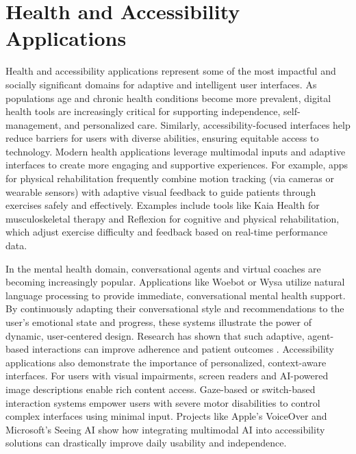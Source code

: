 \documentclass[openany]{book}
\begin{document}
\section{Health and Accessibility Applications}
Health and accessibility applications represent some of the most impactful and socially significant domains for adaptive and intelligent user interfaces. As populations age and chronic health conditions become more prevalent, digital health tools are increasingly critical for supporting independence, self-management, and personalized care. Similarly, accessibility-focused interfaces help reduce barriers for users with diverse abilities, ensuring equitable access to technology.
Modern health applications leverage multimodal inputs and adaptive interfaces to create more engaging and supportive experiences. For example, apps for physical rehabilitation frequently combine motion tracking (via cameras or wearable sensors) with adaptive visual feedback to guide patients through exercises safely and effectively. Examples include tools like Kaia Health for musculoskeletal therapy and Reflexion for cognitive and physical rehabilitation, which adjust exercise difficulty and feedback based on real-time performance data.

In the mental health domain, conversational agents and virtual coaches are becoming increasingly popular. Applications like Woebot or Wysa utilize natural language processing to provide immediate, conversational mental health support. By continuously adapting their conversational style and recommendations to the user's emotional state and progress, these systems illustrate the power of dynamic, user-centered design. Research has shown that such adaptive, agent-based interactions can improve adherence and patient outcomes \cite{fitzpatrick2017delivering}.
Accessibility applications also demonstrate the importance of personalized, context-aware interfaces. For users with visual impairments, screen readers and AI-powered image descriptions enable rich content access. Gaze-based or switch-based interaction systems empower users with severe motor disabilities to control complex interfaces using minimal input. Projects like Apple's VoiceOver and Microsoft's Seeing AI show how integrating multimodal AI into accessibility solutions can drastically improve daily usability and independence.
\end{document}
